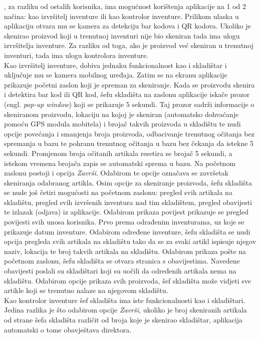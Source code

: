 		, za razliku od ostalih korisnika, ima mogućnost korištenja aplikacije na 1 od 2 načina: kao izvršitelj inventure ili kao kontrolor inventure. Prilikom ulaska u aplikaciju otvara mu se kamera za detekciju bar kodova i QR kodova. Ukoliko je skenirao proizvod koji u trenutnoj inventuri nije bio skeniran tada ima ulogu izvršitelja inventure. Za razliku od toga, ako je proizvod već skeniran u trenutnoj inventuri, tada ima ulogu kontrolora inventure.\\Kao izvršitelj inventure, dobiva jednaku funkcionalnost kao i skladištar i uključuje mu se kamera mobilnog uređaja. Zatim se na ekranu aplikacije prikazuje početni zaslon koji je spreman za skeniranje. Kada se proizvodu skenira i detektira bar kod ili QR kod, šefu skladišta na zaslonu aplikacije iskače prozor (engl. \emph{pop-up window}) koji se prikazuje 5 sekundi. Taj prozor sadrži informacije o skeniranom proizvodu, lokaciju na kojoj je skeniran (automatsko dohvaćanje pomoću GPS modula mobitela) i brojač takvih proizvoda u skladištu te nudi opcije povećanja i smanjenja broja proizvoda, odbacivanje trenutnog očitanja bez spremanja u bazu te pohranu trenutnog očitanja u bazu bez čekanja da istekne 5 sekundi. Promjenom broja očitanih artikala resetira se brojač 5 sekundi, a istekom vremena brojača zapis se automatski sprema u bazu. Na početnom zaslonu postoji i opcija \emph{Završi}. Odabirom te opcije označava se završetak skeniranja odabranog artikla. Osim opcije za skeniranje proizvoda, šefu skladišta se nude još četiri mogućosti na početnom zaslonu: pregled svih artikala na skladištu, pregled svih izvršenih inventura nad tim skladištem, pregled obavijesti te izlazak (odjava) iz aplikacije. Odabirom prikaza povijest prikazuje se pregled povijesti svih unosa korisnika. Prvo prema odrađenim inventurama, uz koje se prikazuje datum inventure. Odabirom određene inventure, šefu skladišta se nudi opcija pregleda svih artikala na skladištu tako da se za svaki artikl ispisuje njegov naziv, lokacija te broj takvih artikala na skladištu. Odabirom prikaza pošte na početnom zaslonu, šefu skladišta se otvara stranica s obavijestima. Navedene obavijesti poslali su skladištari koji su uočili da određenih artikala nema na skladištu. Odabirom opcije prikaza svih proizvoda, šef skladišta može vidjeti sve artikle koji se trenutno nalaze na njegovom skladištu.\\Kao kontrolor inventure šef skladišta ima iste funkcionalnosti kao i skladištari. Jedina razlika je što odabirom opcije \emph{Završi}, ukoliko je broj skeniranih artikala od strane šefa skladišta različit od broja koje je skenirao skladištar, aplikacija automatski o tome obavještava direktora.
		
